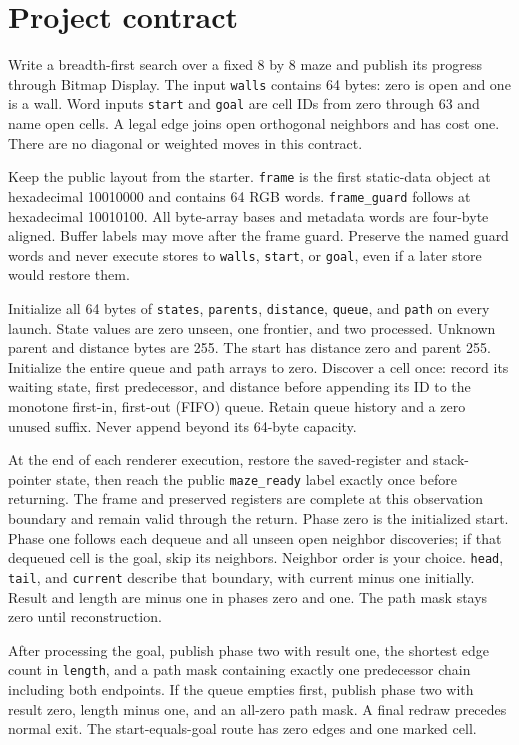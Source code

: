\section{Project contract}\label{maze-contract}

Write a breadth-first search over a fixed 8 by 8 maze and publish its progress through Bitmap Display. The input \texttt{walls} contains 64 bytes: zero is open and one is a wall. Word inputs \texttt{start} and \texttt{goal} are cell IDs from zero through 63 and name open cells. A legal edge joins open orthogonal neighbors and has cost one. There are no diagonal or weighted moves in this contract.

Keep the public layout from the starter. \texttt{frame} is the first static-data object at hexadecimal 10010000 and contains 64 RGB words. \texttt{frame\_guard} follows at hexadecimal 10010100. All byte-array bases and metadata words are four-byte aligned. Buffer labels may move after the frame guard. Preserve the named guard words and never execute stores to \texttt{walls}, \texttt{start}, or \texttt{goal}, even if a later store would restore them.

Initialize all 64 bytes of \texttt{states}, \texttt{parents}, \texttt{distance}, \texttt{queue}, and \texttt{path} on every launch. State values are zero unseen, one frontier, and two processed. Unknown parent and distance bytes are 255. The start has distance zero and parent 255. Initialize the entire queue and path arrays to zero. Discover a cell once: record its waiting state, first predecessor, and distance before appending its ID to the monotone first-in, first-out (FIFO) queue. Retain queue history and a zero unused suffix. Never append beyond its 64-byte capacity.

At the end of each renderer execution, restore the saved-register and stack-pointer state, then reach the public \texttt{maze\_ready} label exactly once before returning. The frame and preserved registers are complete at this observation boundary and remain valid through the return. Phase zero is the initialized start. Phase one follows each dequeue and all unseen open neighbor discoveries; if that dequeued cell is the goal, skip its neighbors. Neighbor order is your choice. \texttt{head}, \texttt{tail}, and \texttt{current} describe that boundary, with current minus one initially. Result and length are minus one in phases zero and one. The path mask stays zero until reconstruction.

After processing the goal, publish phase two with result one, the shortest edge count in \texttt{length}, and a path mask containing exactly one predecessor chain including both endpoints. If the queue empties first, publish phase two with result zero, length minus one, and an all-zero path mask. A final redraw precedes normal exit. The start-equals-goal route has zero edges and one marked cell.

